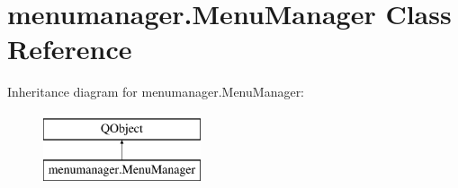 \hypertarget{classmenumanager_1_1MenuManager}{}\section{menumanager.\+Menu\+Manager Class Reference}
\label{classmenumanager_1_1MenuManager}
Inheritance diagram for menumanager.\+Menu\+Manager\+:\begin{figure}[H]
\begin{center}
\leavevmode
\includegraphics[height=2.000000cm]{classmenumanager_1_1MenuManager}
\end{center}
\end{figure}
